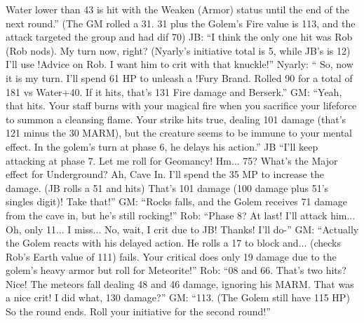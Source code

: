 \begin{multimog}
Water lower than 43 is hit with the Weaken (Armor)
status until the end of the next round.” (The GM rolled a
31. 31 plus the Golem's Fire value is 113, and the attack
targeted the group and had dif 70)
JB: “I think the only one hit was Rob (Rob nods).
My turn now, right? (Nyarly's initiative total is 5, while
JB's is 12) I'll use !Advice on Rob. I want him to crit with
that knuckle!”
Nyarly: “ So, now it is my turn. I'll spend 61 HP
to unleash a !Fury Brand. Rolled 90 for a total of 181 vs
Water+40. If it hits, that's 131 Fire damage and Berserk.”
GM: “Yeah, that hits. Your staff burns with your
magical fire when you sacrifice your lifeforce to summon
a cleansing flame. Your strike hits true, dealing 101
damage (that's 121 minus the 30 MARM), but the
creature seems to be immune to your mental effect. In the
golem's turn at phase 6, he delays his action.”
JB “I'll keep attacking at phase 7. Let me roll for
Geomancy! Hm... 75? What’s the Major effect for
Underground? Ah, Cave In. I'll spend the 35 MP to
increase the damage. (JB rolls a 51 and hits) That's 101
damage (100 damage plus 51's singles digit)! Take that!”
GM: “Rocks falls, and the Golem receives 71
damage from the cave in, but he's still rocking!”
Rob: “Phase 8? At last! I'll attack him... Oh, only
11... I miss... No, wait, I crit due to JB! Thanks! I'll do-”
GM: “Actually the Golem reacts with his delayed
action. He rolls a 17 to block and... (checks Rob's Earth
value of 111) fails. Your critical does only 19 damage due
to the golem's heavy armor but roll for Meteorite!”
Rob: “08 and 66. That's two hits? Nice! The
meteors fall dealing 48 and 46 damage, ignoring his
MARM. That was a nice crit! I did what, 130 damage?”
GM: “113. (The Golem still have 115 HP) So the
round ends. Roll your initiative for the second round!”
\end{multimog}

